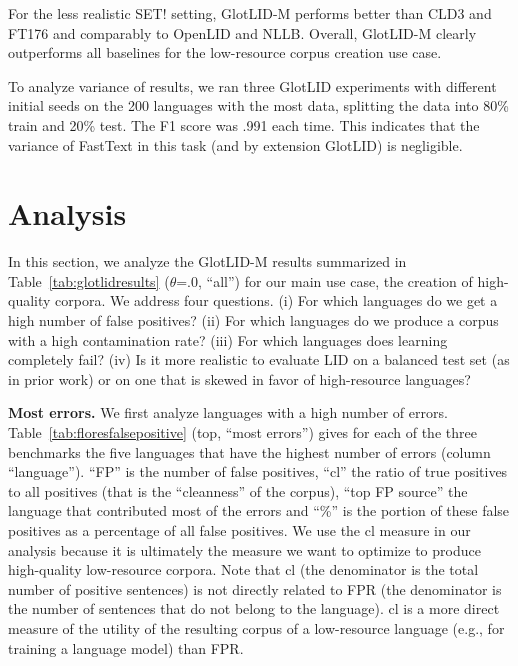 \documentclass[11pt]{article}
\newcommand{\baseex}{SET!\xspace}
\def\modelname{\mbox{GlotLID-M}\xspace}
\def\ft176{FT176\xspace}
\def\edin{OpenLID\xspace}
\def\nllb{NLLB\xspace}
\def\tabref#1{Table~\ref{tab:#1}}
\def\seclabel#1{\label{sec:#1}\label{p:#1}}
\begin{document}
For the less realistic \baseex setting,
\modelname performs better than CLD3 and \ft176 and
comparably to \edin and \nllb. 
Overall, \modelname  clearly outperforms all baselines
for the low-resource corpus creation use case.



To analyze variance of results, we ran
three GlotLID experiments with different initial seeds
on the 200 languages with the most data, splitting the data
into 80\% train and 20\% test. The F1 score was .991 each
time. This indicates that the variance of FastText in this task (and by
extension GlotLID) is negligible.

\section{Analysis}
\seclabel{analysis}

In this section, we analyze
the \modelname
results summarized
in \tabref{glotlidresults}
($\theta$=.0, ``all'')
for our
main use case, the creation of high-quality
corpora. We address four questions. (i) For which languages
do we get a high  number of false positives? (ii)
For which languages do we produce a corpus with a high
contamination rate?
(iii) For which
languages does learning completely fail? (iv)
Is it more realistic to evaluate LID on a balanced test set
(as in prior work) or on one that is skewed in favor
of high-resource languages?



\textbf{Most errors.}
We first analyze
languages with a high number of errors.
\tabref{floresfalsepositive} (top, ``most errors'')
gives
for each of the three
benchmarks 
the five languages that have the highest number of errors
(column ``language''). ``FP'' is the number of false
positives, ``cl'' the ratio of true positives to all
positives (that is the ``cleanness'' of the corpus), ``top
FP source'' the language that contributed most of the errors
and ``\%'' is the portion of these false positives as a
percentage of all false positives.
We use the cl measure in our analysis
because it is ultimately the measure we want to optimize to
produce high-quality low-resource corpora.
Note that cl (the denominator is the total  number of positive sentences) is
not directly related to FPR (the denominator is the number of
sentences  that do not belong to the language). cl is a more
direct measure of the utility of the resulting corpus of a
low-resource language (e.g., for training a language
model) than FPR.
\end{document}
